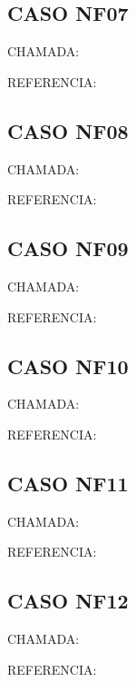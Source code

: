 \documentclass{undftex}
\begin{document}
\begin{refsection}\section*{CASO NF07}\noindent CHAMADA: \par\noindent REFERENCIA:\par\printbibliography[heading=none]\end{refsection}\clearpage
\begin{refsection}\section*{CASO NF08}\noindent CHAMADA: \par\noindent REFERENCIA:\par\printbibliography[heading=none]\end{refsection}\clearpage
\begin{refsection}\section*{CASO NF09}\noindent CHAMADA: \par\noindent REFERENCIA:\par\printbibliography[heading=none]\end{refsection}\clearpage
\begin{refsection}\section*{CASO NF10}\noindent CHAMADA: \par\noindent REFERENCIA:\par\printbibliography[heading=none]\end{refsection}\clearpage
\begin{refsection}\section*{CASO NF11}\noindent CHAMADA: \par\noindent REFERENCIA:\par\printbibliography[heading=none]\end{refsection}\clearpage
\begin{refsection}\section*{CASO NF12}\noindent CHAMADA: \par\noindent REFERENCIA:\par\printbibliography[heading=none]\end{refsection}\clearpage
\end{document}
